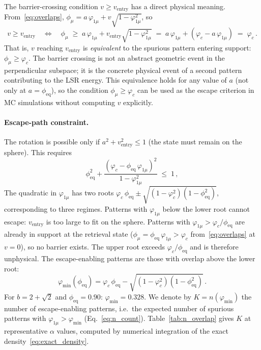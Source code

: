 \documentclass[11pt]{article}
\begin{document}
The barrier-crossing condition $v \geq v_{\mathrm{entry}}$ has a direct physical meaning.  From~\eqref{eq:overlaps}, $\phi_\mu = a\,\varphi_{1\mu} + v\sqrt{1-\varphi_{1\mu}^2}$, so
\[
v \geq v_{\mathrm{entry}} \quad\Longleftrightarrow\quad
\phi_\mu \;\geq\; a\,\varphi_{1\mu} + v_{\mathrm{entry}}\sqrt{1-\varphi_{1\mu}^2}
\;=\; a\,\varphi_{1\mu} + (\varphi_c - a\,\varphi_{1\mu})
\;=\; \varphi_c\,.
\]
That is, $v$ reaching $v_{\mathrm{entry}}$ is \emph{equivalent} to the spurious pattern entering support: $\phi_\mu \geq \varphi_c$.  The barrier crossing is not an abstract geometric event in the perpendicular subspace; it is the concrete physical event of a second pattern contributing to the LSR energy.  This equivalence holds for any value of $a$ (not only at $a = \phi_{\mathrm{eq}}$), so the condition $\phi_\mu \geq \varphi_c$ can be used as the escape criterion in MC simulations without computing $v$ explicitly.

\paragraph{Escape-path constraint.}
The rotation is possible only if $a^2 + v_{\mathrm{entry}}^2 \leq 1$ (the state must remain on the sphere).  This requires
\begin{equation}
\phi_{\mathrm{eq}}^2 + \frac{(\varphi_c - \phi_{\mathrm{eq}}\,\varphi_{1\mu})^2}{1-\varphi_{1\mu}^2} \;\leq\; 1\,,
\label{eq:sphere_constraint}
\end{equation}
The quadratic in $\varphi_{1\mu}$ has two roots $\varphi_c\,\phi_{\mathrm{eq}} \pm \sqrt{(1-\varphi_c^2)(1-\phi_{\mathrm{eq}}^2)}$, corresponding to three regimes.  Patterns with $\varphi_{1\mu}$ below the lower root cannot escape: $v_{\mathrm{entry}}$ is too large to fit on the sphere.  Patterns with $\varphi_{1\mu} > \varphi_c/\phi_{\mathrm{eq}}$ are already in support at the retrieval state ($\phi_\mu = \phi_{\mathrm{eq}}\,\varphi_{1\mu} > \varphi_c$ from~\eqref{eq:overlaps} at $v = 0$), so no barrier exists.  The upper root exceeds $\varphi_c/\phi_{\mathrm{eq}}$ and is therefore unphysical.  The escape-enabling patterns are those with overlap above the lower root:
\begin{equation}
\varphi_{\min}(\phi_{\mathrm{eq}}) = \varphi_c\,\phi_{\mathrm{eq}} - \sqrt{(1-\varphi_c^2)(1-\phi_{\mathrm{eq}}^2)}\,.
\label{eq:phi_min}
\end{equation}
For $b = 2+\sqrt{2}$ and $\phi_{\mathrm{eq}} = 0.90$: $\varphi_{\min} = 0.328$.  We denote by $K = n(\varphi_{\min})$ the number of escape-enabling patterns, i.e.\ the expected number of spurious patterns with $\varphi_{1\mu} > \varphi_{\min}$ (Eq.~\eqref{eq:n_count}).  Table~\ref{tab:n_overlap} gives $K$ at representative $\alpha$ values, computed by numerical integration of the exact density~\eqref{eq:exact_density}.
\end{document}
